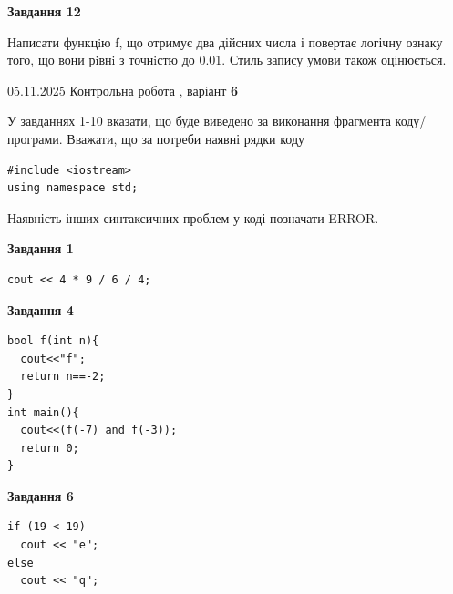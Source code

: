 \documentclass[12pt, ukrainian]{article}
\begin{document}
{\begin {large}
\begin{minipage}[t]{11.0cm}
\begin{center}
\textbf{Завдання 12}
\end{center}

Написати функцiю f, що отримує два дійсних числа і повертає логічну ознаку того, що вони рiвнi з точнiстю до 0.01. Стиль запису умови також оцінюється.\par

\end{minipage}

\end {large}}
\newpage

{\Large{05.11.2025 Контрольна робота , варіант  \No \textbf { 6 }\par}}
{
\begin {large}
У завданнях 1-10 вказати, що буде виведено за виконання фрагмента коду/про\-гра\-ми.
Вважати, що за потреби наявні рядки коду
\begin{verbatim}
#include <iostream>
using namespace std;
\end{verbatim}
Наявність інших синтаксичних проблем у коді позначати ERROR.

\begin{minipage}[t]{7.0cm}

\begin{center}
\textbf{Завдання 1}
\end{center}
\vspace{-8mm}

\begin{verbatim}
cout << 4 * 9 / 6 / 4;
\end{verbatim}



\begin{center}
\textbf{Завдання 4}
\end{center}
\vspace{-8mm}

\begin{verbatim}
bool f(int n){
  cout<<"f";
  return n==-2;
}
int main(){
  cout<<(f(-7) and f(-3));
  return 0;
}
\end{verbatim}



\begin{center}
\textbf{Завдання 6}
\end{center}
\vspace{-8mm}

\begin{verbatim}
if (19 < 19)
  cout << "e";
else
  cout << "q";
\end{verbatim}




\end{minipage}
\end{large}}
\end{document}
